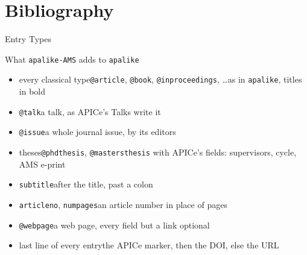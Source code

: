 \documentclass[presentation,\almamaterseal,apice]{beamer}\mode<presentation>{\usetheme{\almamaterpreset}}
\begin{document}


\section{Bibliography}

\begin{frame}[c]{Entry Types}
%
\begin{block}{What \texttt{apalike-AMS} adds to \texttt{apalike}}
\begin{itemize}
	\item every classical type\textemdash{}\texttt{@article}, \texttt{@book}, \texttt{@inproceedings}, \ldots{}\textemdash{}as in \texttt{apalike}, titles in bold
	\item \texttt{@talk}\textemdash{}a talk, as APICe's Talks write it
	\item \texttt{@issue}\textemdash{}a whole journal issue, by its editors
	\item theses\textemdash{}\texttt{@phdthesis}, \texttt{@mastersthesis} with APICe's fields: supervisors, cycle, AMS e-print
	\item \texttt{subtitle}\textemdash{}after the title, past a colon
	\item \texttt{articleno}, \texttt{numpages}\textemdash{}an article number in place of pages
	\item \texttt{@webpage}\textemdash{}a web page, every field but a link optional
	\item last line of every entry\textemdash{}the APICe marker, then the DOI, else the URL
\end{itemize}
\end{block}
%
\end{frame}
\end{document}
